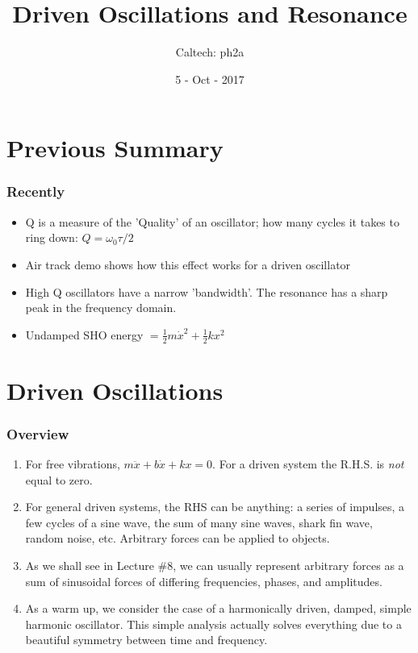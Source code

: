 \documentclass[pdf,hideothersubsections]{beamer}
\begin{document}
\title{Driven Oscillations and Resonance}  
\author{Caltech: ph2a}
\date{5 - Oct - 2017}

\frame{\titlepage} 



\section{Previous Summary}
\begin{frame}
\frametitle{Recently}
\begin{itemize}
\item Q is a measure of the 'Quality' of an oscillator; how many cycles it
  takes to ring down: $Q = \omega_0 \tau / 2$
\pause
\item Air track demo shows how this effect works for a driven oscillator
\pause
\item High Q oscillators have a narrow 'bandwidth'. The resonance has
  a sharp peak in the frequency domain.
\pause
\item Undamped SHO energy $= \frac{1}{2}m \dot{x}^2 + \frac{1}{2}k x^2$
\end{itemize}
\end{frame}




\section{Driven Oscillations}
\begin{frame}
\frametitle{Overview}
\pause
\begin{enumerate}
\item For free vibrations, $m \ddot{x} + b \dot{x} + k x = 0$. For a
  driven system the R.H.S. is \emph{not} equal to zero.
\pause
\item For general driven systems, the RHS can be anything: a series of impulses, a few
  cycles of a sine wave, the sum of many sine waves, shark fin wave,
  random noise, etc. Arbitrary forces can be applied to objects.
\pause
\item As we shall see in Lecture \#8, we can usually represent
  arbitrary forces as a sum of sinusoidal forces of differing
  frequencies, phases, and amplitudes.
\pause
\item As a warm up, we consider the case of a harmonically driven,
  damped, simple harmonic oscillator. This simple analysis actually
  solves everything due to a beautiful symmetry between time and frequency.
\end{enumerate}
\end{frame}
\end{document}
